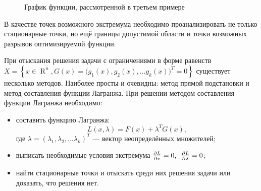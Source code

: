 \documentclass[preprint,russian,a5paper,10pt,twoside,mediummath]{ncc}
\begin{document}
\begin{figure}[ht] \centering
{}
\footnotesize \caption{График функции, рассмотренной в третьем примере\label{fig:extremum:third_example}}
\end{figure}

В качестве точек возможного экстремума необходимо проанализировать не только стационарные точки, но ещё границы допустимой области и точки возможных разрывов оптимизируемой функции.

При отыскания решения задачи с ограничениями в форме равенств $ X=\left\{ x \in \mathop{R}^n, G \left( x \right) = { \bigl( g_1(x), g_2(x),\ldots g_k(x) \bigr) }^T = 0 \right\} $ существует несколько методов. Наиболее просты и очевидны: метод прямой подстановки и метод составления функции Лагранжа. При решении методом составления функции Лагранжа необходимо:
\begin{itemize}
\item составить функцию Лагранжа:
\begin{equation}\label{equ:extremum:Lagrange}
L \left( x, \lambda \right) = F \left( x \right) + \lambda ^T G\left( x \right) ,
\end{equation}
где $ \lambda = { \left( \lambda _1, \lambda _2,\ldots \lambda _k \right) }^T $ --- вектор неопределённых множителей;
\item выписать необходимые условия экстремума $ \frac{\partial L}{\partial x} = 0, \enskip \frac{\partial L}{\partial \lambda } = 0 $;
\item найти стационарные точки и отыскать среди них решения задачи или доказать, что решения нет.
\end{itemize}
\end{document}
